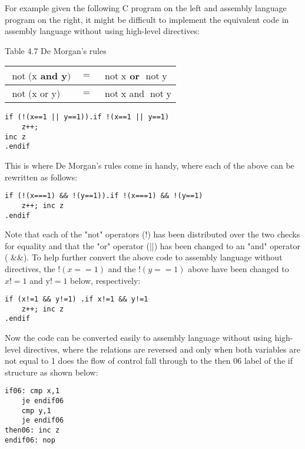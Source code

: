 \documentclass[10pt]{article}
\begin{document}
For example given the following C program on the left and assembly language program on the right, it might be difficult to implement the equivalent code in assembly language without using high-level directives:

Table 4.7 De Morgan's rules

\begin{center}
\begin{tabular}{|l|l|l|}
\hline
$\operatorname{not}(\mathrm{x}$ and y$)$ & $=$ & $\operatorname{not} \mathrm{x}$ or $\operatorname{not} \mathrm{y}$ \\
\hline
$\operatorname{not}(\mathrm{x}$ or y$)$ & $=$ & $\operatorname{not} \mathrm{x}$ and $\operatorname{not} \mathrm{y}$ \\
\hline
\end{tabular}
\end{center}

\begin{verbatim}
if (!(x==1 || y==1)).if !(x==1 || y==1)
    z++;
inc z
.endif
\end{verbatim}

This is where De Morgan's rules come in handy, where each of the above can be rewritten as follows:

\begin{verbatim}
if (!(x===1) && !(y==1)).if !(x===1) && !(y==1)
    z++; inc z
.endif
\end{verbatim}

Note that each of the "not" operators (!) has been distributed over the two checks for equality and that the "or" operator (||) has been changed to an "and" operator ( \&\&). To help further convert the above code to assembly language without directives, the $!(x==1)$ and the $!(y==1)$ above have been changed to $x!=1$ and $\mathrm{y}!=1$ below, respectively:

\begin{verbatim}
if (x!=1 && y!=1) .if x!=1 && y!=1
    z++; inc z
.endif
\end{verbatim}

Now the code can be converted easily to assembly language without using high-level directives, where the relations are reversed and only when both variables are not equal to 1 does the flow of control fall through to the then 06 label of the if structure as shown below:

\begin{verbatim}
if06: cmp x,1
    je endif06
    cmp y,1
    je endif06
then06: inc z
endif06: nop
\end{verbatim}
\end{document}
